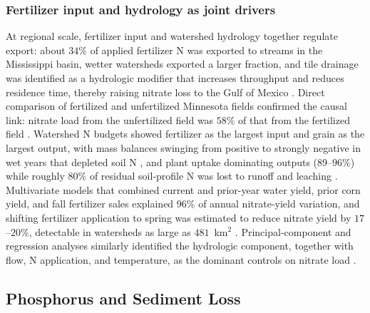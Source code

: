\documentclass[11pt]{article}
\begin{document}
\subsubsection{Fertilizer input and hydrology as joint drivers}

At regional scale, fertilizer input and watershed hydrology together
regulate export: about $34\%$ of applied fertilizer N was exported to
streams in the Mississippi basin, wetter watersheds exported a larger
fraction, and tile drainage was identified as a hydrologic modifier that
increases throughput and reduces residence time, thereby raising nitrate
loss to the Gulf of Mexico \parencite{Raymond2012}. Direct comparison of
fertilized and unfertilized Minnesota fields confirmed the causal link:
nitrate load from the unfertilized field was $58\%$ of that from the
fertilized field \parencite{Ghane2016b}. Watershed N budgets showed
fertilizer as the largest input and grain as the largest output, with
mass balances swinging from positive to strongly negative in wet years
that depleted soil N \parencite{Gentry2009}, and plant uptake dominating
outputs ($89$--$96\%$) while roughly $80\%$ of residual soil-profile N was
lost to runoff and leaching \parencite{Dattamudi2020}. Multivariate models
that combined current and prior-year water yield, prior corn yield, and
fall fertilizer sales explained $96\%$ of annual nitrate-yield variation,
and shifting fertilizer application to spring was estimated to reduce
nitrate yield by $17$--$20\%$, detectable in watersheds as large as
$481$~km$^2$ \parencite{Gentry2014}. Principal-component and regression
analyses similarly identified the hydrologic component, together with
flow, N application, and temperature, as the dominant controls on nitrate
load \parencite{Li2015}.

\subsection{Phosphorus and Sediment Loss}
\end{document}
